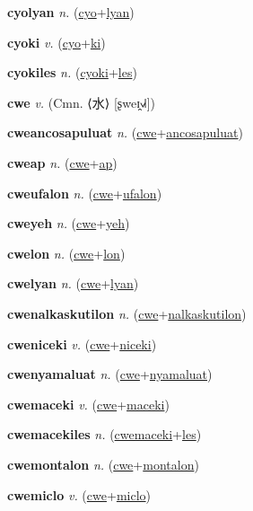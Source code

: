 \textbf{\hypertarget{cyolyan}{cyolyan}} \textit{n.} (\hyperlink{cyo}{cyo}+\allowbreak \hyperlink{lyan}{lyan})


\textbf{\hypertarget{cyoki}{cyoki}} \textit{v.} (\hyperlink{cyo}{cyo}+\allowbreak \hyperlink{ki}{ki})


\textbf{\hypertarget{cyokiles}{cyokiles}} \textit{n.} (\hyperlink{cyoki}{cyoki}+\allowbreak \hyperlink{les}{les})


\textbf{\hypertarget{cwe}{cwe}} \textit{v.} (Cmn. ⟨{\chinese{}水}⟩ [ʂweɪ̯˧˩˧])


\textbf{\hypertarget{cweancosapuluat}{cweancosapuluat}} \textit{n.} (\hyperlink{cwe}{cwe}+\allowbreak \hyperlink{ancosapuluat}{ancosapuluat})


\textbf{\hypertarget{cweap}{cweap}} \textit{n.} (\hyperlink{cwe}{cwe}+\allowbreak \hyperlink{ap}{ap})


\textbf{\hypertarget{cweufalon}{cweufalon}} \textit{n.} (\hyperlink{cwe}{cwe}+\allowbreak \hyperlink{ufalon}{ufalon})


\textbf{\hypertarget{cweyeh}{cweyeh}} \textit{n.} (\hyperlink{cwe}{cwe}+\allowbreak \hyperlink{yeh}{yeh})


\textbf{\hypertarget{cwelon}{cwelon}} \textit{n.} (\hyperlink{cwe}{cwe}+\allowbreak \hyperlink{lon}{lon})


\textbf{\hypertarget{cwelyan}{cwelyan}} \textit{n.} (\hyperlink{cwe}{cwe}+\allowbreak \hyperlink{lyan}{lyan})


\textbf{\hypertarget{cwenalkaskutilon}{cwenalkaskutilon}} \textit{n.} (\hyperlink{cwe}{cwe}+\allowbreak \hyperlink{nalkaskutilon}{nalkaskutilon})


\textbf{\hypertarget{cweniceki}{cweniceki}} \textit{v.} (\hyperlink{cwe}{cwe}+\allowbreak \hyperlink{niceki}{niceki})


\textbf{\hypertarget{cwenyamaluat}{cwenyamaluat}} \textit{n.} (\hyperlink{cwe}{cwe}+\allowbreak \hyperlink{nyamaluat}{nyamaluat})


\textbf{\hypertarget{cwemaceki}{cwemaceki}} \textit{v.} (\hyperlink{cwe}{cwe}+\allowbreak \hyperlink{maceki}{maceki})


\textbf{\hypertarget{cwemacekiles}{cwemacekiles}} \textit{n.} (\hyperlink{cwemaceki}{cwemaceki}+\allowbreak \hyperlink{les}{les})


\textbf{\hypertarget{cwemontalon}{cwemontalon}} \textit{n.} (\hyperlink{cwe}{cwe}+\allowbreak \hyperlink{montalon}{montalon})


\textbf{\hypertarget{cwemiclo}{cwemiclo}} \textit{v.} (\hyperlink{cwe}{cwe}+\allowbreak \hyperlink{miclo}{miclo})


